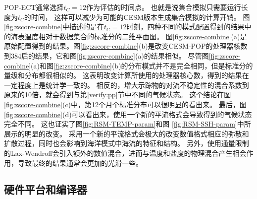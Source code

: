 POP-ECT通常选择$t_C = 12$作为评估的时间点。
也就是说集合模拟只需要运行长度为$t_C$的时间， 这样可以减少为可能的CESM版本生成集合模拟的计算开销。
图 \ref{fig:zscore-combine}中描述的是在$t_C = 12$时刻，四种不同的模式配置得到的结果中的海表温度相对于数据集合的标准分的二维平面图。
图\ref{fig:zscore-combine}(a)是原始配置得到的结果。图\ref{fig:zscore-combine}(b)是改变CESM-POP的处理器核数到384后的结果，它和图\ref{fig:zscore-combine}(a)的结果相似。
尽管图\ref{fig:zscore-combine}(a)和图\ref{fig:zscore-combine}(b)的分布模式并不是完全相同，但是标准分的量级和分布都很相似的。
这表明改变计算所使用的处理器核心数，得到的结果在一定程度上是统计学一致的。
相反的，增大示踪物的对流不稳定性的混合系数到原来的10倍，就会得到与第\ref{verify:pp}节中不同的气候状态。
这个结论在图\ref{fig:zscore-combine}(c)中，第12个月个标准分布可以很明显的看出来。 
最后，图\ref{fig:zscore-combine}(d)可以看出来，使用一个新的平流格式会导致得到的气候状态完全不同。
这也证实了图\ref{fig:RSM-TEMP-param}和图 \ref{fig:RSM-SSH-param}中所展示的明显的改变。 
采用一个新的平流格式会极大的改变数值格式相应的弥散和扩散过程\cite{tseng2008}，同时也会影响到海洋模式中海流的特征和结构\cite{tseng2006}。
另外，使用通量限制的Lax-Wendroff会引入额外的数值混合，进而与温度和盐度的物理混合产生相会作用，导致最终的结果通常会更加的光滑一些。


\subsection{硬件平台和编译器}\label{sec:harware}

